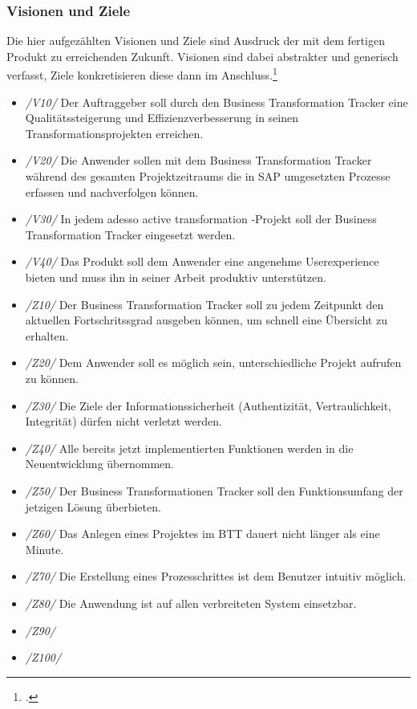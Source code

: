 \subsubsection{Visionen und Ziele}
Die hier aufgezählten Visionen und Ziele sind Ausdruck der mit dem fertigen Produkt zu erreichenden Zukunft. Visionen sind dabei abstrakter und generisch verfasst, Ziele konkretisieren diese dann im Anschluss.\footcite[Vgl.][S. 457]{balzert}
\begin{itemize}
    \item[] \emph{/V10/} Der Auftraggeber soll durch den Business Transformation Tracker eine Qualitätssteigerung und Effizienzverbesserung in seinen Transformationsprojekten erreichen.
    \item[] \emph{/V20/} Die Anwender sollen mit dem Business Transformation Tracker während des gesamten Projektzeitraums die in SAP umgesetzten Prozesse erfassen und nachverfolgen können.
    \item[] \emph{/V30/} In jedem adesso active transformation -Projekt soll der Business Transformation Tracker eingesetzt werden.
    \item[] \emph{/V40/} Das Produkt soll dem Anwender eine angenehme Userexperience bieten und muss ihn in seiner Arbeit produktiv unterstützen.
\end{itemize}

\begin{itemize} 
    \item[] \emph{/Z10/} Der Business Transformation Tracker soll zu jedem Zeitpunkt den aktuellen Fortschritssgrad ausgeben können, um schnell eine Übersicht zu erhalten.
    \item[] \emph{/Z20/} Dem Anwender soll es möglich sein, unterschiedliche Projekt aufrufen zu können.
    \item[] \emph{/Z30/} Die Ziele der Informationssicherheit (Authentizität, Vertraulichkeit, Integrität) dürfen nicht verletzt werden.
    \item[] \emph{/Z40/} Alle bereits jetzt implementierten Funktionen werden in die Neuentwicklung übernommen.         
    \item[] \emph{/Z50/} Der Business Transformationen Tracker soll den Funktionsumfang der jetzigen Lösung überbieten.  
    \item[] \emph{/Z60/} Das Anlegen eines Projektes im BTT dauert nicht länger als eine Minute.
    \item[] \emph{/Z70/} Die Erstellung eines Prozesschrittes ist dem Benutzer intuitiv möglich.
    \item[] \emph{/Z80/} Die Anwendung ist auf allen verbreiteten System einsetzbar.
    \item[] \emph{/Z90/} 
    \item[] \emph{/Z100/} 
\end{itemize}


